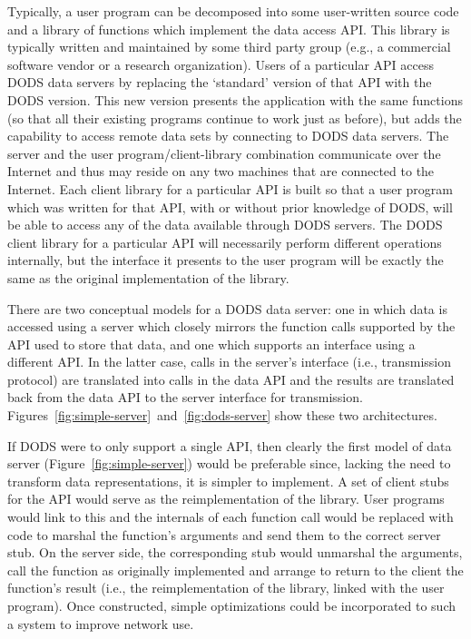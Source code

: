 Typically, a user program can be decomposed into some user-written source
code and a library of functions which implement the data access API\@. This
library is typically written and maintained by some third party group (e.g.,
a commercial software vendor or a research organization). Users of a
particular API access DODS data servers by replacing the `standard' version
of that API with the DODS version. This new version presents the application
with the same functions (so that all their existing programs continue to work
just as before), but adds the capability to access remote data sets by
connecting to DODS data servers. The server and the user
program/client-library combination communicate over the Internet and thus may
reside on any two machines that are connected to the Internet. Each client
library for a particular API is built so that a user program which was
written for that API, with or without prior knowledge of DODS, will be able
to access any of the data available through DODS servers. The DODS client
library for a particular API will necessarily perform different operations
internally, but the interface it presents to the user program will be exactly
the same as the original implementation of the library.

There are two conceptual models for a DODS data server: one in which data is
accessed using a server which closely mirrors the function calls supported by
the API used to store that data, and one which supports an interface using a
different API\@. In the latter case, calls in the server's interface (i.e.,
transmission protocol) are translated into calls in the data API and the
results are translated back from the data API to the server interface for
transmission. Figures~\ref{fig:simple-server}~and~\ref{fig:dods-server} show
these two architectures.

If DODS were to only support a single API, then clearly the first model of
data server (Figure~\ref{fig:simple-server}) would be preferable since,
lacking the need to transform data representations, it is simpler to
implement. A set of client stubs for the API would serve as the
reimplementation of the library. User programs would link to this and the
internals of each function call would be replaced with code to marshal the
function's arguments and send them to the correct server stub. On the server
side, the corresponding stub would unmarshal the arguments, call the function
as originally implemented and arrange to return to the client the function's
result (i.e., the reimplementation of the library, linked with the user
program). Once constructed, simple optimizations could be incorporated to
such a system to improve network use.

